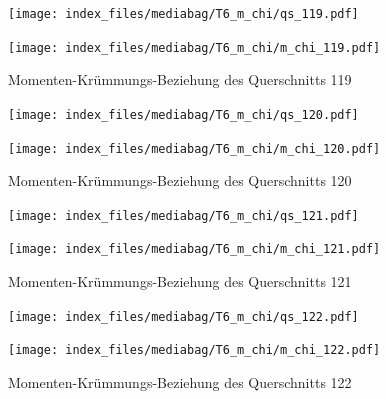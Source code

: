 \documentclass[
  11pt,
  letterpaper,
]{scrreprt}
\begin{document}
\begin{figure}[H]

\begin{minipage}{0.50\linewidth}
\texttt{[image: index\_files/mediabag/T6\_m\_chi/qs\_119.pdf]}\end{minipage}%
%
\begin{minipage}{0.50\linewidth}
\texttt{[image: index\_files/mediabag/T6\_m\_chi/m\_chi\_119.pdf]}\end{minipage}%

\caption{\label{fig-m_chi_appendix}Momenten-Krümmungs-Beziehung des
Querschnitts 119}

\end{figure}%

\begin{figure}[H]

\begin{minipage}{0.50\linewidth}
\texttt{[image: index\_files/mediabag/T6\_m\_chi/qs\_120.pdf]}\end{minipage}%
%
\begin{minipage}{0.50\linewidth}
\texttt{[image: index\_files/mediabag/T6\_m\_chi/m\_chi\_120.pdf]}\end{minipage}%

\caption{\label{fig-m_chi_appendix}Momenten-Krümmungs-Beziehung des
Querschnitts 120}

\end{figure}%

\begin{figure}[H]

\begin{minipage}{0.50\linewidth}
\texttt{[image: index\_files/mediabag/T6\_m\_chi/qs\_121.pdf]}\end{minipage}%
%
\begin{minipage}{0.50\linewidth}
\texttt{[image: index\_files/mediabag/T6\_m\_chi/m\_chi\_121.pdf]}\end{minipage}%

\caption{\label{fig-m_chi_appendix}Momenten-Krümmungs-Beziehung des
Querschnitts 121}

\end{figure}%

\begin{figure}[H]

\begin{minipage}{0.50\linewidth}
\texttt{[image: index\_files/mediabag/T6\_m\_chi/qs\_122.pdf]}\end{minipage}%
%
\begin{minipage}{0.50\linewidth}
\texttt{[image: index\_files/mediabag/T6\_m\_chi/m\_chi\_122.pdf]}\end{minipage}%

\caption{\label{fig-m_chi_appendix}Momenten-Krümmungs-Beziehung des
Querschnitts 122}

\end{figure}%
\end{document}
